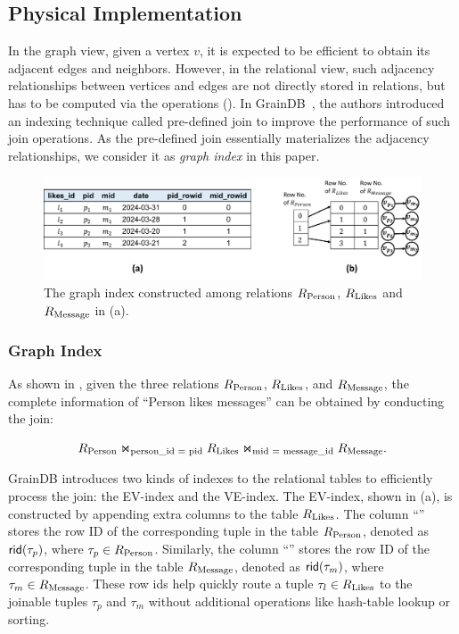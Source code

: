 \subsection{Physical Implementation}
\label{sec:physical-operators}

In the graph view, given a vertex $v$, it is expected to be efficient to obtain its adjacent edges and neighbors. However, in the relational view, such adjacency relationships between vertices and edges are not directly stored in relations, but has to be computed via the \EVjoin operations (). In GrainDB~\cite{graindb}, the authors introduced an indexing technique called pre-defined join to improve the performance of such join operations. As the pre-defined join essentially materializes the adjacency relationships, we consider it as \emph{graph index} in this paper.

\begin{figure}
    \centering
    \includegraphics[width=.8\linewidth]{./figures/graph-index-likes.pdf}
    \caption{The graph index constructed among relations ${R_{\text{Person}}}$, ${R_{\text{Likes}}}$
    and ${R_{\text{Message}}}$ in (a).}
    \label{fig:graph-index}
\end{figure}

\subsubsection{Graph Index}
\label{sec:graph-index}

As shown in , given the three relations ${R_{\text{Person}}}$, ${R_{\text{Likes}}}$, and ${R_{\text{Message}}}$, the complete information of ``Person likes messages'' can be obtained by conducting the join:

\[ {R_{\text{Person}}} \Join_\text{person\_id = pid} {\ensuremath R_{\text{Likes}}} \Join_\text{mid = message\_id} {\ensuremath R_{\text{Message}}}. \]

GrainDB introduces two kinds of indexes to the relational tables to efficiently process the join: the EV-index and the VE-index. The EV-index, shown in (a), is constructed by appending extra columns to the table ${R_{\text{Likes}}}$. The column ``'' stores the row ID of the corresponding tuple in the table ${R_{\text{Person}}}$, denoted as ${\mathsf{rid}}(\tau_{p})$, where $\tau_{p} \in {\ensuremath R_{\text{Person}}}$. Similarly, the column ``'' stores the row ID of the corresponding tuple in the table ${R_{\text{Message}}}$, denoted as ${\mathsf{rid}}(\tau_{m})$, where $\tau_{m} \in {\ensuremath R_{\text{Message}}}$. These row ids help quickly route a tuple $\tau_{l} \in {\ensuremath R_{\text{Likes}}}$ to the joinable tuples $\tau_{p}$ and $\tau_{m}$ without additional operations like hash-table lookup or sorting.

